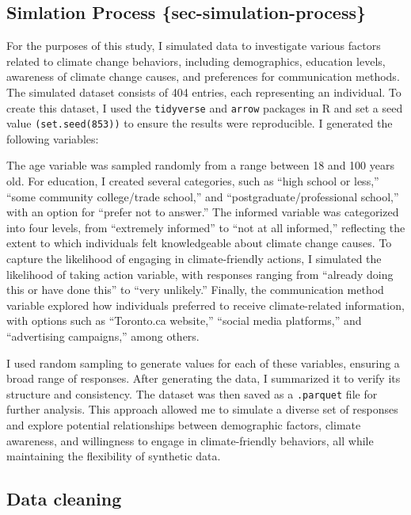 \documentclass[
  letterpaper,
  DIV=11,
  numbers=noendperiod]{scrartcl}
\begin{document}
\subsection{Simlation Process
\{sec-simulation-process\}}\label{simlation-process-sec-simulation-process}

For the purposes of this study, I simulated data to investigate various
factors related to climate change behaviors, including demographics,
education levels, awareness of climate change causes, and preferences
for communication methods. The simulated dataset consists of 404
entries, each representing an individual. To create this dataset, I used
the \texttt{tidyverse} and \texttt{arrow} packages in R and set a seed
value \texttt{(set.seed(853))} to ensure the results were reproducible.
I generated the following variables:

The age variable was sampled randomly from a range between 18 and 100
years old. For education, I created several categories, such as ``high
school or less,'' ``some community college/trade school,'' and
``postgraduate/professional school,'' with an option for ``prefer not to
answer.'' The informed variable was categorized into four levels, from
``extremely informed'' to ``not at all informed,'' reflecting the extent
to which individuals felt knowledgeable about climate change causes. To
capture the likelihood of engaging in climate-friendly actions, I
simulated the likelihood of taking action variable, with responses
ranging from ``already doing this or have done this'' to ``very
unlikely.'' Finally, the communication method variable explored how
individuals preferred to receive climate-related information, with
options such as ``Toronto.ca website,'' ``social media platforms,'' and
``advertising campaigns,'' among others.

I used random sampling to generate values for each of these variables,
ensuring a broad range of responses. After generating the data, I
summarized it to verify its structure and consistency. The dataset was
then saved as a \texttt{.parquet} file for further analysis. This
approach allowed me to simulate a diverse set of responses and explore
potential relationships between demographic factors, climate awareness,
and willingness to engage in climate-friendly behaviors, all while
maintaining the flexibility of synthetic data.

\subsection{Data cleaning}\label{sec-data-cleaning}
\end{document}
